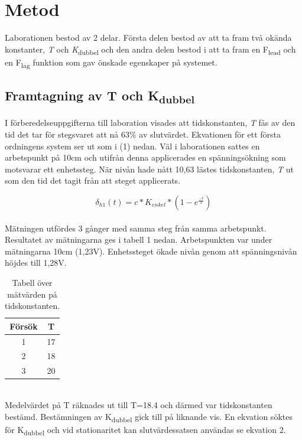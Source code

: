\documentclass{article}
\begin{document}
\section{Metod}
Laborationen bestod av 2 delar. Första delen bestod av att ta fram två okända konstanter, {\itshape T} och {\itshape K}\textsubscript{dubbel} och den andra delen bestod i att ta fram en F\textsubscript{lead} och en F\textsubscript{lag} funktion som gav önskade egenskaper på systemet.

\subsection{Framtagning av T och K\textsubscript{dubbel}}
I förberedelseuppgifterna till laboration visades att tidskonstanten, {\itshape T} fås av den tid det tar för stegsvaret att nå 63\% av slutvärdet. Ekvationen för ett första ordningens system ser ut som i (1) nedan. Väl i laborationen sattes en arbetspunkt på 10cm och utifrån denna applicerades en spänningsökning som motsvarar ett enhetssteg. När nivån hade nått 10,63 lästes tidskonstanten, {\itshape T} ut som den tid det tagit från att steget applicerats. 

\begin{equation}
\delta_{h1}(t)= c*K_{enkel}*(1-e^{\frac{-t}{T}})
\end{equation}
\\
Mätningen utfördes 3 gånger med samma steg från samma arbetspunkt. Resultatet av mätningarna ges i tabell 1 nedan. Arbetspunkten var under mätningarna 10cm (1,23V). Enhetssteget ökade nivån genom att spänningsnivån höjdes till 1,28V. 

\begin{table}[ht] 
\centering 
\begin{tabular}{c c} 
Försök & T \\ [0.5ex] %
\hline
1 & 17 \\
2 & 18 \\
3 & 20 \\

\end{tabular} 
\caption{Tabell över mätvärden på tidskonstanten.}

\end{table}
~\\ %
Medelvärdet på T räknades ut till T=18.4 och därmed var tidskonstanten bestämd. 
Bestämningen av K\textsubscript{dubbel} gick till på liknande vis. En ekvation söktes för K\textsubscript{dubbel} och vid stationaritet kan slutvärdessatsen användas se ekvation 2. 
 
\end{document}

